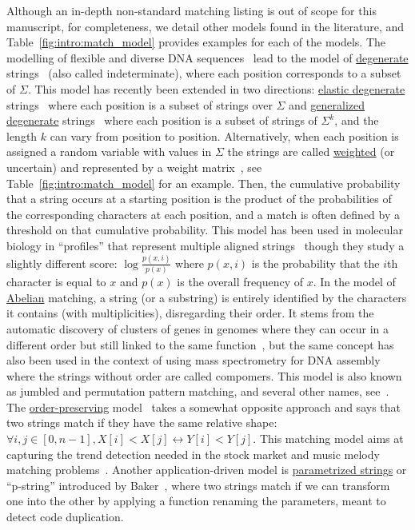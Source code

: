Although an in-depth non-standard matching listing is out of scope for this manuscript, for completeness, we detail other models found in the literature, and Table~\ref{fig:intro:match_model} provides examples for each of the models.
The modelling of flexible and diverse DNA sequences~\cite{comm1970iupac} lead to the model of \underline{degenerate} strings~\cite{abrahamson1987generalized} (also called indeterminate), where each position corresponds to a subset of $\Sigma$.
This model has recently been extended in two directions: \underline{elastic degenerate} strings~\cite{iliopoulos2021efficient} where each position is a subset of strings over $\Sigma$ and \underline{generalized degenerate} strings~\cite{alzamel_et_al:LIPIcs:2018:9323} where each position is a subset of strings of $\Sigma^k$, and the length $k$ can vary from position to position.
Alternatively, when each position is assigned a random variable with values in $\Sigma$ the strings are called \underline{weighted} (or uncertain) and represented by a weight matrix~\cite{thompson1994clustal}, see Table~\ref{fig:intro:match_model} for an example. Then, the cumulative probability that a string occurs at a starting position is the product of the probabilities of the corresponding characters at each position, and a match is often defined by a threshold on that cumulative probability. This model has been used in molecular biology in ``profiles'' that represent multiple aligned strings~\cite{doi:10.1073/pnas.84.13.4355} though they study a slightly different score: $\log \frac{p(x,i)}{p(x)}$ where $p(x,i)$ is the probability that the $i$th character is equal to $x$ and $p(x)$ is the overall frequency of $x$. 
In the model of \underline{Abelian} matching, a string (or a substring) is entirely identified by the characters it contains (with multiplicities), disregarding their order. It stems from the automatic discovery of clusters of genes in genomes where they can occur in a different order but still linked to the same function~\cite{eres2004permutation}, but the same concept has also been used in the context  of using mass spectrometry for DNA assembly~\cite{bocker2003sequencing} where the strings without order are called compomers. This model is also known as jumbled and permutation pattern matching, and several other names, see~\cite{ejaz2010abelian}.
The \underline{order-preserving} model~\cite{kim2014order,kubica2013linear} takes a somewhat opposite approach and says that two strings match if they have the same relative shape: $\forall i,j \in [0,n-1], X[i] < X[j] \leftrightarrow Y[i] < Y[j]$. This matching model aims at capturing the trend detection needed in the stock market and music melody matching problems~\cite{kim2014order}.
%
Another application-driven model is \underline{parametrized strings} or ``p-string'' introduced by Baker~\cite{baker1993theory}, where two strings match if we can transform one into the other by applying a function renaming the parameters, meant to detect code duplication.


